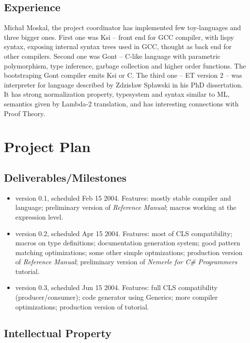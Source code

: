 \documentclass[a4paper,11pt]{article}
\begin{document}
\subsection{Experience}

Micha{\l} Moskal, the project coordinator has implemented few
toy-languages and three bigger ones. First one was Ksi -- front end for
GCC compiler, with lispy syntax, exposing internal syntax trees used in
GCC, thought as back end for other compilers.  Second one was Gont --
C-like language with parametric polymorphism, type inference, garbage
collection and higher order functions. The bootstraping Gont compiler
emits Ksi or C. The third one -- ET version 2 -- was interpreter for
language described by Zdzis{\l}aw Sp{\l}awski in his PhD dissertation.
It has strong normalization property, typesystem and syntax similar to ML,
semantics given by Lambda-2 translation, and has interesting connections
with Proof Theory.


\section{Project Plan}

\subsection{Deliverables/Milestones}
\begin{itemize}
\item version 0.1, scheduled Feb 15 2004. Features:
  mostly stable compiler and language;
  preliminary version of \textit{Reference Manual}; 
  macros working at the expression level.

\item version 0.2, scheduled Apr 15 2004. Features:
  most of CLS compatibility;
  macros on type definitions;
  documentation generation system;
  good pattern matching optimizations;
  some other simple optmizations;
  production version of \textit{Reference Manual};
  preliminary version of \textit{Nemerle for C\# Programmers} tutorial.
  
\item version 0.3, scheduled Jun 15 2004. Features:
  full CLS compatibility (producer/consumer);
  code generator using Generics;
  more compiler optimizations;
  production version of tutorial.
\end{itemize}

\subsection{Intellectual Property}
\end{document}
